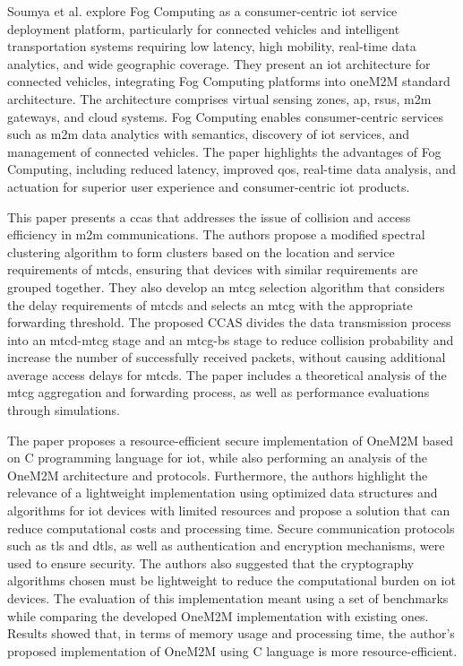 \documentclass[a4paper,fleqn]{cas-dc}
\begin{document}
Soumya et al. \cite{Datta2015} explore Fog Computing as a consumer-centric \gls{iot} service deployment platform, particularly for connected vehicles and intelligent transportation systems requiring low latency, high mobility, real-time data analytics, and wide geographic coverage. They present an \gls{iot} architecture for connected vehicles, integrating Fog Computing platforms into oneM2M standard architecture. The architecture comprises virtual sensing zones, \gls{ap}, \gls{rsus}, \gls{m2m} gateways, and cloud systems. Fog Computing enables consumer-centric services such as \gls{m2m} data analytics with semantics, discovery of \gls{iot} services, and management of connected vehicles. The paper highlights the advantages of Fog Computing, including reduced latency, improved \gls{qos}, real-time data analysis, and actuation for superior user experience and consumer-centric \gls{iot} products.

This paper \cite{Liang2018} presents a \gls{ccas} that addresses the issue of collision and access efficiency in \gls{m2m} communications. The authors propose a modified spectral clustering algorithm to form clusters based on the location and service requirements of \gls{mtcds}, ensuring that devices with similar requirements are grouped together. They also develop an \gls{mtcg} selection algorithm that considers the delay requirements of \gls{mtcds} and selects an \gls{mtcg} with the appropriate forwarding threshold. The proposed CCAS divides the data transmission process into an \gls{mtcd}-\gls{mtcg} stage and an \gls{mtcg}-\gls{bs} stage to reduce collision probability and increase the number of successfully received packets, without causing additional average access delays for \gls{mtcds}. The paper includes a theoretical analysis of the \gls{mtcg} aggregation and forwarding process, as well as performance evaluations through simulations.

The paper \cite{Thielemans2019} proposes a resource-efficient secure implementation of OneM2M based on C programming language for \gls{iot}, while also performing an analysis of the OneM2M architecture and protocols. Furthermore, the authors highlight the relevance of a lightweight implementation using optimized data structures and algorithms for \gls{iot} devices with limited resources and propose a solution that can reduce computational costs and processing time. Secure communication protocols such as \gls{tls} and \gls{dtls}, as well as authentication and encryption mechanisms, were used to ensure security. The authors also suggested that the cryptography algorithms chosen must be lightweight to reduce the computational burden on \gls{iot} devices. The evaluation of this implementation meant using a set of benchmarks while comparing the developed OneM2M implementation with existing ones. Results showed that, in terms of memory usage and processing time, the author's proposed implementation of OneM2M using C language is more resource-efficient.
\end{document}
